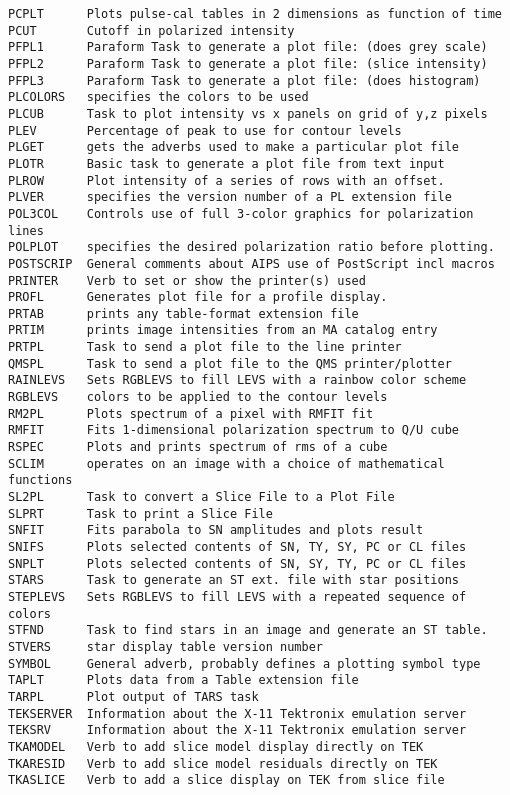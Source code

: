 \begin{verbatim}
PCPLT      Plots pulse-cal tables in 2 dimensions as function of time
PCUT       Cutoff in polarized intensity
PFPL1      Paraform Task to generate a plot file: (does grey scale)
PFPL2      Paraform Task to generate a plot file: (slice intensity)
PFPL3      Paraform Task to generate a plot file: (does histogram)
PLCOLORS   specifies the colors to be used
PLCUB      Task to plot intensity vs x panels on grid of y,z pixels
PLEV       Percentage of peak to use for contour levels
PLGET      gets the adverbs used to make a particular plot file
PLOTR      Basic task to generate a plot file from text input
PLROW      Plot intensity of a series of rows with an offset.
PLVER      specifies the version number of a PL extension file
POL3COL    Controls use of full 3-color graphics for polarization lines
POLPLOT    specifies the desired polarization ratio before plotting.
POSTSCRIP  General comments about AIPS use of PostScript incl macros
PRINTER    Verb to set or show the printer(s) used
PROFL      Generates plot file for a profile display.
PRTAB      prints any table-format extension file
PRTIM      prints image intensities from an MA catalog entry
PRTPL      Task to send a plot file to the line printer
QMSPL      Task to send a plot file to the QMS printer/plotter
RAINLEVS   Sets RGBLEVS to fill LEVS with a rainbow color scheme
RGBLEVS    colors to be applied to the contour levels
RM2PL      Plots spectrum of a pixel with RMFIT fit
RMFIT      Fits 1-dimensional polarization spectrum to Q/U cube
RSPEC      Plots and prints spectrum of rms of a cube
SCLIM      operates on an image with a choice of mathematical functions
SL2PL      Task to convert a Slice File to a Plot File
SLPRT      Task to print a Slice File
SNFIT      Fits parabola to SN amplitudes and plots result
SNIFS      Plots selected contents of SN, TY, SY, PC or CL files
SNPLT      Plots selected contents of SN, SY, TY, PC or CL files
STARS      Task to generate an ST ext. file with star positions
STEPLEVS   Sets RGBLEVS to fill LEVS with a repeated sequence of colors
STFND      Task to find stars in an image and generate an ST table.
STVERS     star display table version number
SYMBOL     General adverb, probably defines a plotting symbol type
TAPLT      Plots data from a Table extension file
TARPL      Plot output of TARS task
TEKSERVER  Information about the X-11 Tektronix emulation server
TEKSRV     Information about the X-11 Tektronix emulation server
TKAMODEL   Verb to add slice model display directly on TEK
TKARESID   Verb to add slice model residuals directly on TEK
TKASLICE   Verb to add a slice display on TEK from slice file

\end{verbatim}

